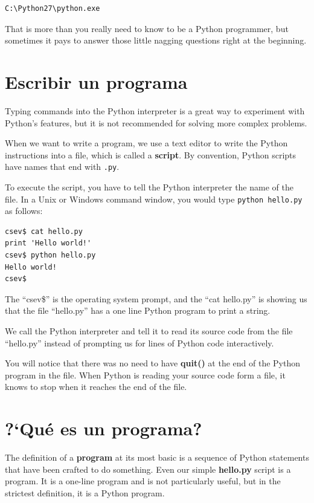 \beforeverb
\begin{verbatim}
C:\Python27\python.exe
\end{verbatim}
\afterverb
%
That is more than you really need to know to be a Python programmer, but
sometimes it pays to answer those little nagging questions right at 
the beginning.

\section{Escribir un programa}

Typing commands into the Python interpreter is a great way to experiment 
with Python's features, but it is not recommended for solving more complex problems.

When we want to write a program, 
we use a text editor to write the Python instructions into a file,
which is called a {\bf script}.  By
convention, Python scripts have names that end with {\tt .py}.


To execute the script, you have to tell the Python interpreter 
the name of the file.  In a Unix or Windows command window, 
you would type {\tt python hello.py} as follows:

\beforeverb
\begin{verbatim}
csev$ cat hello.py
print 'Hello world!'
csev$ python hello.py
Hello world!
csev$
\end{verbatim}
\afterverb
%
The ``csev\$'' is the operating system prompt, and the ``cat hello.py'' is 
showing us that the file ``hello.py'' has a one line Python program to print
a string.

We call the Python interpreter and tell it to read its source code from
the file ``hello.py'' instead of prompting us for lines of Python code
interactively.

You will notice that there was no need to have {\bf quit()} at the end of
the Python program in the file.   When Python is reading your source code
form a file, it knows to stop when it reaches the end of the file.

\section{?`Qu\'e es un programa?}

The definition of a {\bf program} at its most basic is a sequence
of Python statements that have been crafted to do something.
Even our simple {\bf hello.py} script is a program.  It is a one-line
program and is not particularly useful, but in the strictest definition,
it is a Python program.

